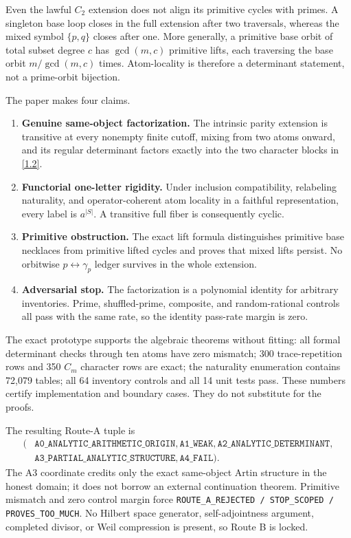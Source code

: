 Even the lawful \(C_2\) extension does not align its primitive cycles with
primes.  A singleton base loop closes in the full extension after two
traversals, whereas the mixed symbol \(\{p,q\}\) closes after one.  More
generally, a primitive base orbit of total subset degree \(c\) has
\(\gcd(m,c)\) primitive lifts, each traversing the base orbit
\(m/\gcd(m,c)\) times.  Atom-locality is therefore a determinant statement,
not a prime-orbit bijection.

The paper makes four claims.

\begin{enumerate}
\item \textbf{Genuine same-object factorization.}
The intrinsic parity extension is transitive at every nonempty finite cutoff,
mixing from two atoms onward, and its regular determinant factors exactly into
the two character blocks in \eqref{1.2}.
\item \textbf{Functorial one-letter rigidity.}
Under inclusion compatibility, relabeling naturality, and operator-coherent
atom locality in a faithful representation, every label is
\(a^{|S|}\).  A transitive full fiber is consequently cyclic.
\item \textbf{Primitive obstruction.}
The exact lift formula distinguishes primitive base necklaces from primitive
lifted cycles and proves that mixed lifts persist.  No orbitwise
\(p\leftrightarrow\gamma_p\) ledger survives in the whole extension.
\item \textbf{Adversarial stop.}
The factorization is a polynomial identity for arbitrary inventories.
Prime, shuffled-prime, composite, and random-rational controls all pass with
the same rate, so the identity pass-rate margin is zero.
\end{enumerate}

The exact prototype supports the algebraic theorems without fitting: all
formal determinant checks through ten atoms have zero mismatch; 300
trace-repetition rows and 350 \(C_m\) character rows are exact; the naturality
enumeration contains 72,079 tables; all 64 inventory controls and all 14 unit
tests pass.  These numbers certify implementation and boundary cases.  They do
not substitute for the proofs.

The resulting Route-A tuple is
\[
\begin{aligned}
(&\texttt{A0\_ANALYTIC\_ARITHMETIC\_ORIGIN},
\texttt{A1\_WEAK},
\texttt{A2\_ANALYTIC\_DETERMINANT},\\
&\texttt{A3\_PARTIAL\_ANALYTIC\_STRUCTURE},
\texttt{A4\_FAIL}).
\end{aligned}
\tag{1.4}\label{1.4}
\]
The A3 coordinate credits only the exact same-object Artin structure in the
honest domain; it does not borrow an external continuation theorem.
Primitive mismatch and zero control margin force
\texttt{ROUTE\_A\_REJECTED / STOP\_SCOPED / PROVES\_TOO\_MUCH}.  No Hilbert
space generator, self-adjointness argument, completed divisor, or Weil
compression is present, so Route B is locked.


